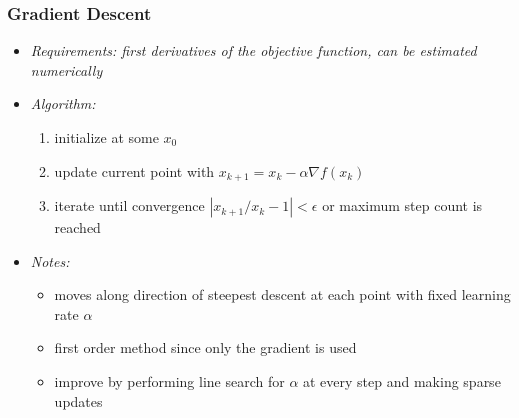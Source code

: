 	\begin{frame}
		\frametitle{Gradient Descent}
		\begin{itemize}
			\item<2-> \itshape{Requirements:} first derivatives of the objective function, can be estimated numerically
			\item<3-> \itshape{Algorithm:}
				\begin{enumerate}
					\item<4-> initialize at some $x_0$
					\item<5-> update current point with $x_{k+1} = x_k - \alpha\nabla f(x_k)$
					\item<6-> iterate until convergence $|x_{k+1} / x_k - 1| < \epsilon$ or maximum step count is reached
				\end{enumerate}
			\item<7-> \itshape{Notes:}
				\begin{itemize}
					\item<8-> moves along direction of steepest descent at each point with fixed learning rate $\alpha$
					\item<9-> first order method since only the gradient is used
					\item<10-> improve by performing line search for $\alpha$ at every step and making sparse updates
				\end{itemize}
		\end{itemize}
	\end{frame}

